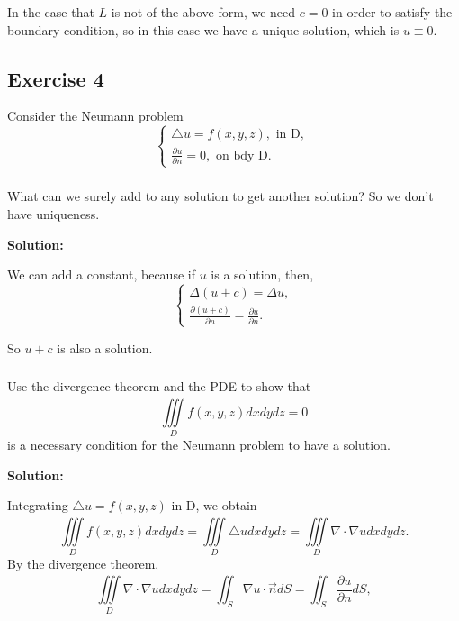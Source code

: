 \documentclass{article}
\begin{document}
		In the case that $L$ is not of the above form, we need $c=0$
		in order to satisfy the boundary condition, so in
		this case we have a unique solution, which is $u
		\equiv 0$.
		
		\subsection{Exercise 4}
		Consider the Neumann problem
		\begin{equation*}
			\begin{cases}
				\triangle u = f(x,y,z), \text{ in D, }
				\\
				\frac{\partial u}{\partial n}=0, \text{ on bdy D. }
			\end{cases}
		\end{equation*}
	
		\subsubsection{}
		What can we surely add to any
		solution to get another solution? So we
	don't have uniqueness.

	\textbf{Solution:}

		We can add a constant, because if $u$ is a solution,
		then,
		\begin{equation*}
			\begin{cases}
			\Delta(u+c)= \Delta u,
             \\
			 \frac{\partial(u+c)}{\partial n}=\frac{\partial u}{\partial n}.
			\end{cases}
		\end{equation*}
		
		So $u+c$ is also a solution.

	\subsubsection{}
	Use the divergence theorem and the PDE to show that
\[
\iiint\limits_{D}^{} f(x,y,z)dxdydz=0
\]
	is a necessary condition for the Neumann problem to have a solution.
		
	\textbf{Solution:}

	Integrating $\triangle u = f(x,y,z)$ in D, we obtain
		\[\iiint\limits_{D}^{} f(x,y,z)dxdydz=\iiint\limits_{D}^{} \triangle u dxdydz=\iiint\limits_{D}^{} \nabla \cdot \nabla u dxdydz.
		\]
		By the divergence theorem,
		\[
			\iiint\limits_{D}^{} \nabla \cdot \nabla u dxdydz=\iint_{S}^{} \nabla u \cdot \vec{n}dS=\iint_{S}^{} \frac{\partial u}{\partial n}dS,
		\]
\end{document}
